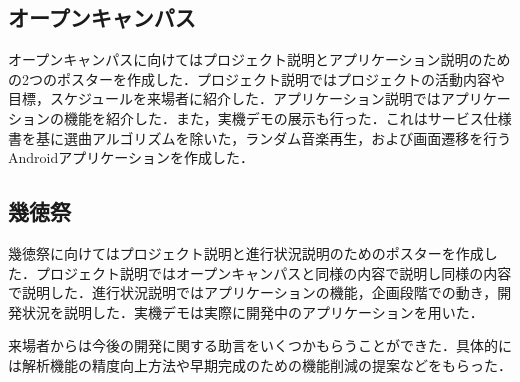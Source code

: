 \subsection{オープンキャンパス}
\par オープンキャンパスに向けてはプロジェクト説明とアプリケーション説明のための2つのポスターを作成した．プロジェクト説明ではプロジェクトの活動内容や目標，スケジュールを来場者に紹介した．アプリケーション説明ではアプリケーションの機能を紹介した．また，実機デモの展示も行った．これはサービス仕様書を基に選曲アルゴリズムを除いた，ランダム音楽再生，および画面遷移を行うAndroidアプリケーションを作成した．

\subsection{幾徳祭}
\par 幾徳祭に向けてはプロジェクト説明と進行状況説明のためのポスターを作成した．プロジェクト説明ではオープンキャンパスと同様の内容で説明し同様の内容で説明した．進行状況説明ではアプリケーションの機能，企画段階での動き，開発状況を説明した．実機デモは実際に開発中のアプリケーションを用いた．
\par 来場者からは今後の開発に関する助言をいくつかもらうことができた．具体的には解析機能の精度向上方法や早期完成のための機能削減の提案などをもらった．
